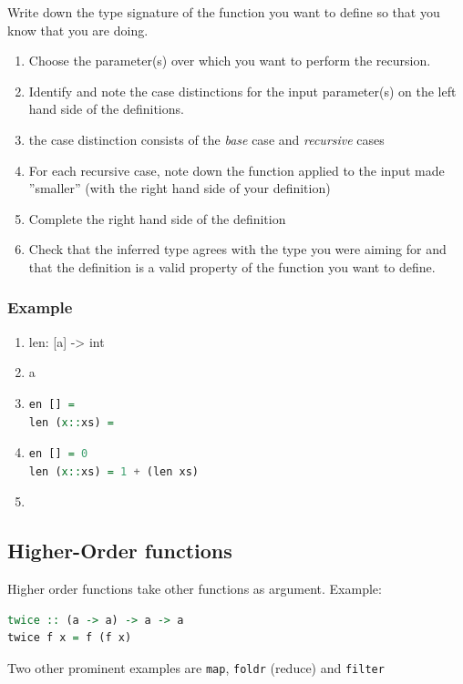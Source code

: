 Write down the type signature of the function you want to define so that you know that you are doing.
\begin{enumerate}
\item Choose the parameter(s) over which you want to perform the recursion.
\item Identify and note the case distinctions for the input parameter(s) on the left hand side of the definitions.
\item the case distinction consists of the \emph{base} case and \emph{recursive} cases
\item For each recursive case, note down the function applied to the input made ''smaller'' (with the right hand side of your definition)
\item Complete the right hand side of the definition
\item Check that the inferred type agrees with the type you were aiming for and that the definition is a valid property of the function you want to define.
\end{enumerate}

\subsubsection{Example}
\begin{enumerate}
\item len: [a] -> int
\item a
\item \begin{lstlisting}[language=haskell]
en [] = 
len (x::xs) = 
\end{lstlisting}
\item \begin{lstlisting}[language=haskell]
en [] = 0
len (x::xs) = 1 + (len xs)
\end{lstlisting}
\item %
\end{enumerate}

\subsection{Higher-Order functions}
Higher order functions take other functions as argument. Example:
\begin{lstlisting}[language=haskell]
twice :: (a -> a) -> a -> a
twice f x = f (f x)
\end{lstlisting}

Two other prominent examples are \lstinline|map|, \lstinline|foldr| (reduce) and \lstinline|filter|

